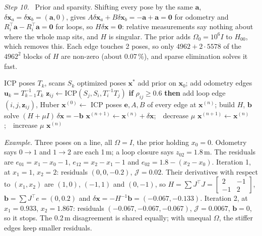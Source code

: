 \documentclass[letterpaper, 10pt, conference]{ieeeconf}
\newcommand{\x}{\mathbf{x}}
\newcommand{\step}[1]{\par\noindent\textit{Step #1.}\ }
\begin{document}
\step{10} Prior and sparsity. Shifting every pose by the same $\mathbf{a}$,
$\delta\x_a=\delta\x_b=(\mathbf{a},0)$, gives
$A\delta\x_a+B\delta\x_b=-\mathbf{a}+\mathbf{a}=\mathbf{0}$ for odometry and
$R_i^\top\mathbf{a}-R_i^\top\mathbf{a}=\mathbf{0}$ for loops, so
$H\delta\x=\mathbf{0}$: relative measurements say nothing about where the
whole map sits, and $H$ is singular. The prior adds $\Omega_0=10^6I$ to
$H_{00}$, which removes this. Each edge touches 2 poses, so only
$4962+2\cdot5578$ of the $4962^2$ blocks of $H$ are non-zero (about
0.07\,\%), and sparse elimination solves it fast.

\begin{algorithm}[H]
\caption{Pose graph optimization}\label{alg:posegraph}
\footnotesize
\begin{algorithmic}[1]
\Require ICP poses $T_k$, scans $S_k$
\Ensure optimized poses $\x^*$
\State add prior on $\x_0$; add odometry edges $\mathbf{u}_k=T_{k-1}^{-1}T_k$
  \State $\mathbf{z}_{ij}\gets\text{ICP}(S_j,S_i,T_i^{-1}T_j)$
  \State \textbf{if} $\rho_{ij}\ge0.6$ \textbf{then} add loop edge $(i,j,\mathbf{z}_{ij})$, Huber
\EndFor
\State $\x^{(0)}\gets$ ICP poses
\Repeat {}
  \State $\mathbf{e},A,B$ of every edge at $\x^{(n)}$; build $H$, $\mathbf{b}$
  \State solve $(H+\mu I)\,\delta\x=-\mathbf{b}$
  \If{$\mathcal{J}(\x^{(n)}+\delta\x)<\mathcal{J}(\x^{(n)})$}
    \State $\x^{(n+1)}\gets\x^{(n)}+\delta\x$;\ \ decrease $\mu$
  \Else
    \State $\x^{(n+1)}\gets\x^{(n)}$;\ \ increase $\mu$
  \EndIf
{}
\State \Return $\x^{(n)}$
\end{algorithmic}
\end{algorithm}

\emph{Example.} Three poses on a line, all $\Omega=I$, the prior holding
$x_0=0$. Odometry says $0\to1$ and $1\to2$ are each 1\,m; a loop closure
says $z_{02}=1.8$\,m. The residuals are $e_{01}=x_1-x_0-1$,
$e_{12}=x_2-x_1-1$ and $e_{02}=1.8-(x_2-x_0)$. Iteration 1, at $x_1=1$,
$x_2=2$: residuals $(0,0,-0.2)$, $\mathcal{J}=0.02$. Their derivatives with
respect to $(x_1,x_2)$ are $(1,0)$, $(-1,1)$ and $(0,-1)$, so
$H=\sum J^\top J=\left[\begin{smallmatrix}2&-1\\-1&2\end{smallmatrix}\right]$,
$\mathbf{b}=\sum J^\top e=(0,0.2)$ and
$\delta\x=-H^{-1}\mathbf{b}=(-0.067,-0.133)$. Iteration 2, at $x_1=0.933$,
$x_2=1.867$: residuals $(-0.067,-0.067,-0.067)$, $\mathcal{J}=0.0067$,
$\mathbf{b}=0$, so it stops. The 0.2\,m disagreement is shared equally; with
unequal $\Omega$, the stiffer edges keep smaller residuals.
\end{document}

